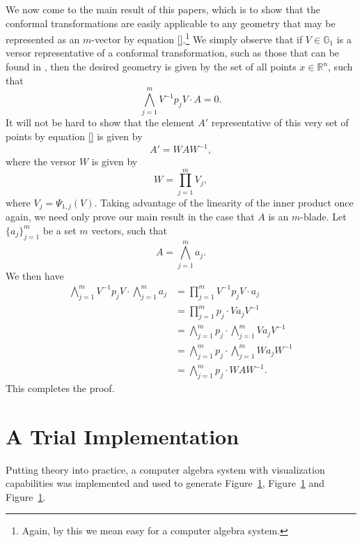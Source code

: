 \documentclass{ecgd-l}
\theoremstyle{definition}
\theoremstyle{remark}
\numberwithin{equation}{section}
\newcommand{\G}{\mathbb{G}}
\newcommand{\R}{\mathbb{R}}
\begin{document}
We now come to the main result of this papers, which is to show
that the conformal transformations are easily applicable to any geometry
that may be represented as an $m$-vector by equation \eqref{}.\footnote{Again,
by this we mean easy for a computer algebra system.}
We simply observe that if $V\in\G_1$ is a versor representative
of a conformal transformation, such as those that can be found in \cite{Dorst07}, then the desired
geometry is given by the set of all points $x\in\R^n$, such that
\begin{equation*}
\bigwedge_{j=1}^m V^{-1}p_jV\cdot A=0.
\end{equation*}
It will not be hard to show that the element $A'$ representative
of this very set of points by equation \eqref{} is given by
\begin{equation*}
A' = WAW^{-1},
\end{equation*}
where the versor $W$ is given by
\begin{equation*}
W = \prod_{j=1}^m V_j,
\end{equation*}
where $V_j=\Psi_{1,j}(V)$.
Taking advantage of the linearity of the inner product once again,
we need only prove our main result in the case that $A$ is an $m$-blade.
Let $\{a_j\}_{j=1}^m$ be a set $m$ vectors, such that
\begin{equation*}
A = \bigwedge_{j=1}^m a_j.
\end{equation*}
We then have
\begin{align*}
\bigwedge_{j=1}^m V^{-1}p_jV\cdot\bigwedge_{j=1}^m a_j &= \prod_{j=1}^m V^{-1}p_jV\cdot a_j \\
 &= \prod_{j=1}^m p_j\cdot Va_jV^{-1} \\
&= \bigwedge_{j=1}^m p_j\cdot\bigwedge_{j=1}^m Va_jV^{-1} \\
&= \bigwedge_{j=1}^m p_j\cdot\bigwedge_{j=1}^m Wa_jW^{-1} \\
&= \bigwedge_{j=1}^m p_j\cdot WAW^{-1}.
\end{align*}
This completes the proof.

\section{A Trial Implementation}

Putting theory into practice, a computer algebra system with
visualization capabilities was implemented and used to generate Figure~\ref{},
Figure~\ref{} and Figure~\ref{}.



\end{document}
